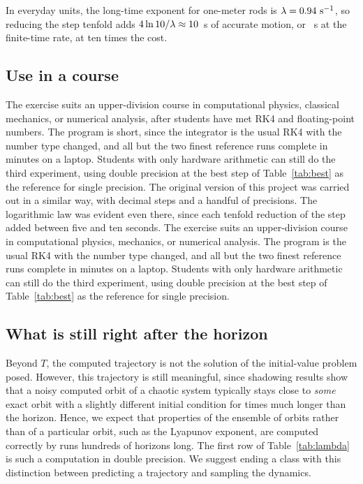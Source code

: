 \documentclass[prb,reprint,amsmath,amssymb,longbibliography]{revtex4-1}
\begin{document}
In everyday units, the long-time exponent for one-meter rods is
$\lambda=0.94~\mathrm{s^{-1}}$, so reducing the step tenfold adds
$4\ln10/\lambda\approx10$~s of accurate motion, or \decadeSIFT~s at the
finite-time rate, at ten times the cost.

\subsection{Use in a course}

\ifdefined\longversion
The exercise suits an upper-division course in computational physics, classical
mechanics, or numerical analysis, after students have met RK4 and
floating-point numbers. The program is short, since the integrator is the usual
RK4 with the number type changed, and all but the two finest reference runs
complete in minutes on a laptop. Students with only hardware arithmetic can
still do the third experiment, using double precision at the best step of
Table~\ref{tab:best} as the reference for single precision. The original
version of this project was carried out in a similar way, with decimal steps
and a handful of precisions. The logarithmic law was evident even there, since
each tenfold reduction of the step added between five and ten seconds.
\else
The exercise suits an upper-division course in computational physics,
mechanics, or numerical analysis. The program is the usual RK4 with the number
type changed, and all but the two finest reference runs complete in minutes on
a laptop. Students with only hardware arithmetic can still do the third
experiment, using double precision at the best step of Table~\ref{tab:best} as
the reference for single precision.
\fi

\subsection{What is still right after the horizon}

Beyond $T$, the computed trajectory is not the solution of the initial-value
problem posed. However, this trajectory is still meaningful, since shadowing
results\cite{hammel1987,hammel1988,grebogi1990,sauer1997,hayes2004} show that a
noisy computed orbit of a chaotic system typically stays close to \emph{some}
exact orbit with a slightly different initial condition for times much longer
than the horizon. Hence, we expect that properties of the ensemble of orbits
rather than of a particular orbit, such as the Lyapunov exponent, are computed
correctly by runs hundreds of horizons long. The first row of
Table~\ref{tab:lambda} is such a computation in double precision. We suggest
ending a class with this distinction between predicting a trajectory and
sampling the dynamics.
\end{document}
